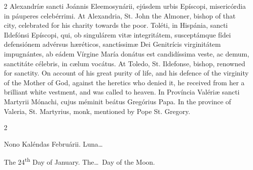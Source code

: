 \begin{paracol}{2}
Alexandríæ sancti Joánnis Eleemosynárii, 
 ejúsdem urbis Epíscopi, misericórdia in páuperes celebérrimi.
\switchcolumn
{}
At Alexandria, St. John the Almoner, bishop of that city, celebrated for his 
 charity towards the poor.
\switchcolumn*
{}
Toléti, in Hispánia, sancti Ildefónsi Epíscopi, qui, ob singulárem vitæ 
 integritátem, susceptámque fídei defensiónem advérsus hæréticos, sanctíssimæ 
 Dei Genitrícis virginitátem impugnántes, ab eádem Vírgine María donátus est 
 candidíssima veste, ac demum, sanctitáte célebris, in cælum vocátus.
\switchcolumn
{}
At Toledo, St. Ildefonse, bishop, renowned for sanctity. On account of 
 his great purity of life, and his defence of the virginity of the Mother of 
 God, against the heretics who denied it, he received from her a brilliant 
 white vestment, and was called to heaven.
\switchcolumn*
{}
In Província Valériæ sancti Martyrii Mónachi, 
 cujus méminit beátus Gregórius Papa.
\switchcolumn
{}
In the province of Valeria, St. Martyrius, monk, mentioned by Pope St. 
 Gregory.
\switchcolumn*
{}
\end{paracol}


\begin{paracol}{2}
\begin{center}{\color{gregoriocolor} Nono Kaléndas Februárii. 
 Luna\dots\ }\end{center}
\switchcolumn
{}
\begin{center}{\color{gregoriocolor} The 24\textsuperscript{th} Day of 
 January. The\dots\ Day of the Moon.}\end{center}
\end{paracol}

